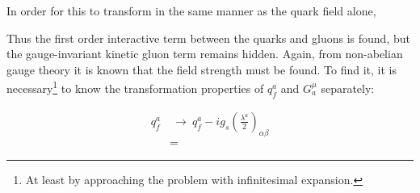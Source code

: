 \documentclass[11pt,a4paper]{article}
\begin{document}
In order for this to transform in the same manner as the quark field alone,

Thus the first order interactive term between the quarks and gluons is found, but the gauge-invariant kinetic gluon term remains hidden. Again, from non-abelian gauge theory it is known that the field strength must be found. To find it, it is necessary\footnote{At least by approaching the problem with infinitesimal expansion.} to know the transformation properties of $q_f^a$ and $G_a^\mu$ separately:

\begin{align}
	q_f^a &\:\rightarrow\: q_f^a - ig_s\left(\frac{\lambda^a}{2}\right)_{\alpha\beta}\\
	&=
\end{align}
\end{document}
